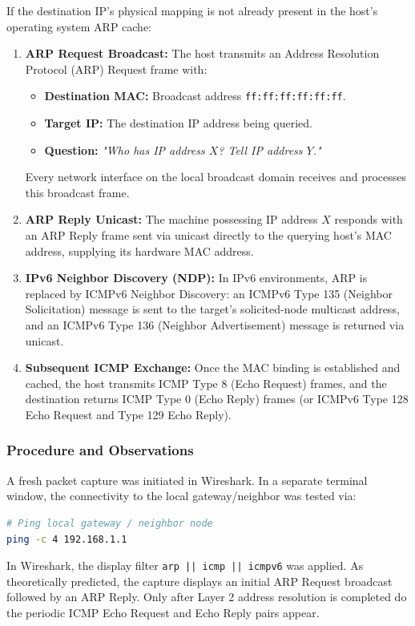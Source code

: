 \documentclass[12pt, a4paper]{article}
\begin{document}
If the destination IP's physical mapping is not already present in the host's operating system ARP cache:
\begin{enumerate}
    \item \textbf{ARP Request Broadcast:} The host transmits an Address Resolution Protocol (ARP) Request frame with:
    \begin{itemize}
        \item \textbf{Destination MAC:} Broadcast address \texttt{ff:ff:ff:ff:ff:ff}.
        \item \textbf{Target IP:} The destination IP address being queried.
        \item \textbf{Question:} \textit{"Who has IP address $X$? Tell IP address $Y$."}
    \end{itemize}
    Every network interface on the local broadcast domain receives and processes this broadcast frame.
    \item \textbf{ARP Reply Unicast:} The machine possessing IP address $X$ responds with an ARP Reply frame sent via unicast directly to the querying host's MAC address, supplying its hardware MAC address.
    \item \textbf{IPv6 Neighbor Discovery (NDP):} In IPv6 environments, ARP is replaced by ICMPv6 Neighbor Discovery: an ICMPv6 Type 135 (Neighbor Solicitation) message is sent to the target's solicited-node multicast address, and an ICMPv6 Type 136 (Neighbor Advertisement) message is returned via unicast.
    \item \textbf{Subsequent ICMP Exchange:} Once the MAC binding is established and cached, the host transmits ICMP Type 8 (Echo Request) frames, and the destination returns ICMP Type 0 (Echo Reply) frames (or ICMPv6 Type 128 Echo Request and Type 129 Echo Reply).
\end{enumerate}

\subsubsection{Procedure and Observations}
A fresh packet capture was initiated in Wireshark. In a separate terminal window, the connectivity to the local gateway/neighbor was tested via:
\begin{lstlisting}[language=bash, caption=ICMP Traffic Generation Command]
# Ping local gateway / neighbor node
ping -c 4 192.168.1.1
\end{lstlisting}
In Wireshark, the display filter \texttt{arp || icmp || icmpv6} was applied. As theoretically predicted, the capture displays an initial ARP Request broadcast followed by an ARP Reply. Only after Layer 2 address resolution is completed do the periodic ICMP Echo Request and Echo Reply pairs appear.
\end{document}

